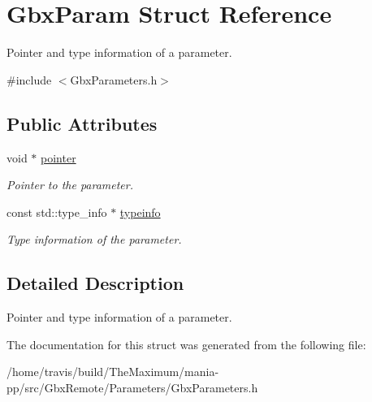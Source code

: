 \hypertarget{structGbxParam}{\section{Gbx\-Param Struct Reference}
\label{structGbxParam}
}


Pointer and type information of a parameter.  




{\ttfamily \#include $<$Gbx\-Parameters.\-h$>$}

\subsection*{Public Attributes}
\begin{DoxyCompactItemize}
\item 
\hypertarget{structGbxParam_a19b53f8dacdd8937e1020775f8615495}{void $\ast$ \hyperlink{structGbxParam_a19b53f8dacdd8937e1020775f8615495}{pointer}}\label{structGbxParam_a19b53f8dacdd8937e1020775f8615495}

\begin{DoxyCompactList}\small\item\em Pointer to the parameter. \end{DoxyCompactList}\item 
\hypertarget{structGbxParam_afb3596a5ba95fda1e27a5c6b4ed517b5}{const std\-::type\-\_\-info $\ast$ \hyperlink{structGbxParam_afb3596a5ba95fda1e27a5c6b4ed517b5}{typeinfo}}\label{structGbxParam_afb3596a5ba95fda1e27a5c6b4ed517b5}

\begin{DoxyCompactList}\small\item\em Type information of the parameter. \end{DoxyCompactList}\end{DoxyCompactItemize}


\subsection{Detailed Description}
Pointer and type information of a parameter. 

The documentation for this struct was generated from the following file\-:\begin{DoxyCompactItemize}
\item 
/home/travis/build/\-The\-Maximum/mania-\/pp/src/\-Gbx\-Remote/\-Parameters/Gbx\-Parameters.\-h\end{DoxyCompactItemize}
